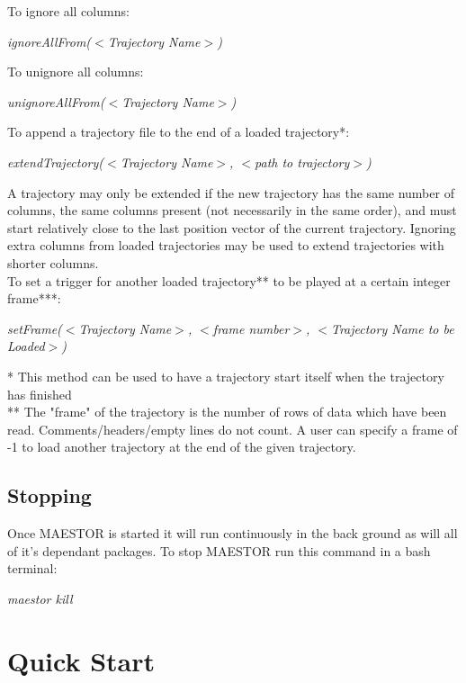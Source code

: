 \documentclass[12pt]{article}
\begin{document}
To ignore all columns:
    \begin{center}
    	\textit{ignoreAllFrom($<$Trajectory Name$>$)}
	\end{center}

To unignore all columns: 
    \begin{center}
    	\textit{unignoreAllFrom($<$Trajectory Name$>$)}
	\end{center}

To append a trajectory file to the end of a loaded trajectory*:
    \begin{center}
    	\textit{extendTrajectory($<$Trajectory Name$>$, $<$path to trajectory$>$)}
    \end{center}

\noindent * A trajectory may only be extended if the new trajectory has the same number of columns, the same columns present (not 
necessarily in the same order), and must start relatively close to the last position vector of the current trajectory.
Ignoring extra columns from loaded trajectories may be used to extend trajectories with shorter columns.\\

\noindent To set a trigger for another loaded trajectory** to be played at a certain integer frame***:
    \begin{center}
    	\textit{setFrame($<$Trajectory Name$>$, $<$frame number$>$, $<$Trajectory Name to be Loaded$>$)}
    \end{center}

\noindent ** This method can be used to have a trajectory start itself when the trajectory has finished\\

\noindent *** The "frame" of the trajectory is the number of rows of data which have been read. Comments/headers/empty lines do not count.
A user can specify a frame of -1 to load another trajectory at the end of the given trajectory.

\subsection{Stopping}

Once MAESTOR is started it will run continuously in the back ground as will all of it's dependant packages. To stop MAESTOR run this command in a bash terminal:
	\begin{center}
		\textit{maestor kill}
	\end{center}

	
\section{Quick Start}
\end{document}
